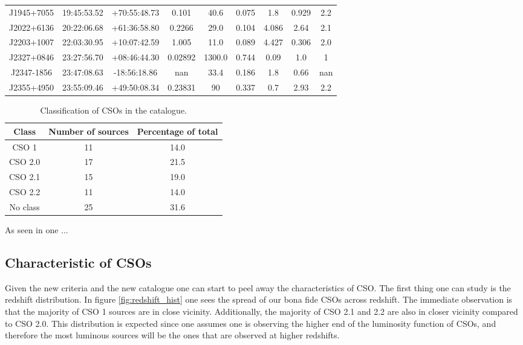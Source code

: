 \begin{table}
\begin{tabular}{@{}ccccccccc@{}}
        J1945+7055 & 19:45:53.52 & +70:55:48.73 & 0.101 & 40.6 & 0.075 & 1.8 & 0.929 & 2.2 \\
        J2022+6136 & 20:22:06.68 & +61:36:58.80 & 0.2266 & 29.0 & 0.104 & 4.086 & 2.64 & 2.1 \\
        J2203+1007 & 22:03:30.95 & +10:07:42.59 & 1.005 & 11.0 & 0.089 & 4.427 & 0.306 & 2.0 \\
        J2327+0846 & 23:27:56.70 & +08:46:44.30 & 0.02892 & 1300.0 & 0.744 & 0.09 & 1.0 & 1 \\
        J2347-1856 & 23:47:08.63 & -18:56:18.86 & nan & 33.4 & 0.186 & 1.8 & 0.66 & nan \\
        J2355+4950 & 23:55:09.46 & +49:50:08.34 & 0.23831 & 90 & 0.337 & 0.7 & 2.93 & 2.2 \\
        \bottomrule

     
    \end{tabular}
\end{table}


\begin{table}
    \caption{Classification of CSOs in the catalogue.}
    \label{tab:CSO_class}
    \centering
    \begin{tabular}{@{}ccc@{}}
        \toprule
        Class & Number of sources & Percentage of total  \\ \midrule
        CSO 1 & 11 & 14.0  \\
        CSO 2.0 & 17 & 21.5  \\
        CSO 2.1 & 15 & 19.0  \\
        CSO 2.2 & 11 & 14.0  \\
        No class & 25 & 31.6  \\
        \bottomrule
    \end{tabular}
\end{table}
\newpage

As seen in \cite{ALBERS2024} one ...
\subsection{Characteristic of CSOs}
Given the new criteria and the new catalogue one can start to peel away the characteristics of CSO. The first thing one can study is the redshift distribution. In figure \ref{fig:redshift_hist} one sees the spread of our bona fide CSOs across redshift. The immediate observation is that the majority of CSO 1 sources are in close vicinity. Additionally, the majority of CSO 2.1 and 2.2 are also in closer vicinity compared to CSO 2.0. This distribution is expected since one assumes one is observing the higher end of the luminosity function of CSOs, and therefore the most luminous sources will be the ones that are observed at higher redshifts. 

